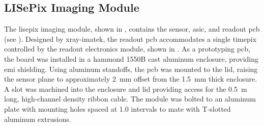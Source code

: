 \documentclass[../../../main.tex]{subfiles}%
\begin{document}
%
    \subsection{LISePix Imaging Module}%
    \label{sec:chapter-3:advanced-imaging:imaging-module}%
    The \gls{lisepix} imaging module, shown in , contains the sensor, \gls{asic}, and readout \gls{pcb} (see ).
    Designed by \gls{xray-imatek}, the readout \gls{pcb} accommodates a single \gls{timepix} controlled by the readout electronics module, shown in .
    As a prototyping \gls{pcb}, the board was installed in a \gls{hammond} 1550B cast aluminum enclosure, providing \gls{emi} shielding.
    Using aluminum standoffs, the \gls{pcb} was mounted to the lid, raising the sensor plane to approximately \SI{2}{\milli\meter} offset from the \SI{1.5}{\milli\meter} thick enclosure.
    A slot was machined into the enclosure and lid providing access for the \SI{0.5}{\meter} long, high-channel density ribbon cable.
    The module was bolted to an aluminum plate with mounting holes spaced at \SI{1.0}{\inch} intervals to mate with T-slotted aluminum extrusions.
\end{document}
